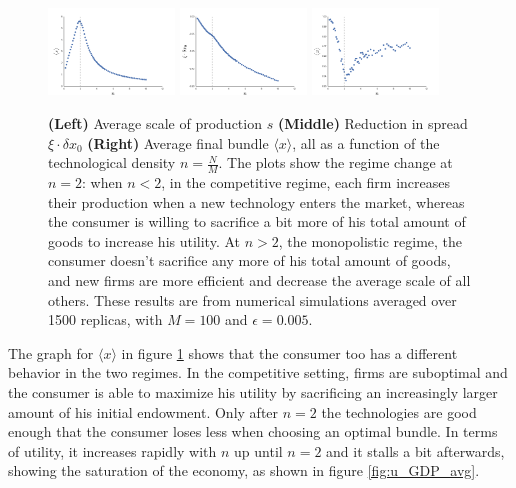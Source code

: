 \begin{figure}[!ht]
  \centering
  \includegraphics[width=0.3\textwidth]{figs_rle/s_avg.png}
  \includegraphics[width=0.3\textwidth]{figs_rle/spread_reduction.png}
  \includegraphics[width=0.3\textwidth]{figs_rle/x_avg.png}
  \caption{\textbf{(Left)} Average scale of production $s$ \textbf{(Middle)} Reduction in spread $\xi \cdot \delta x_0$ \textbf{(Right)} Average final bundle $\langle x \rangle$, all as a function of the technological density $n = \frac{N}{M}$. The plots show the regime change at $n=2$: when $n < 2$, in the competitive regime, each firm increases their production when a new technology enters the market, whereas the consumer is willing to sacrifice a bit more of his total amount of goods to increase his utility. At $n>2$, the monopolistic regime, the consumer doesn't sacrifice any more of his total amount of goods, and new firms are more efficient and decrease the average scale of all others. These results are from numerical simulations averaged over 1500 replicas, with $M=100$ and $\epsilon = 0.005$.}
  \label{fig:s_x_avg}
\end{figure}


The graph for $\langle x \rangle$ in figure \ref{fig:s_x_avg} shows that the consumer too has a different behavior in the two regimes. In the competitive setting, firms are suboptimal and the consumer is able to maximize his utility by sacrificing an increasingly larger amount of his initial endowment. Only after $n=2$ the technologies are good enough that the consumer loses less when choosing an optimal bundle. In terms of utility, it increases rapidly with $n$ up until $n=2$ and it stalls a bit afterwards, showing the saturation of the economy, as shown in figure \ref{fig:u_GDP_avg}.

